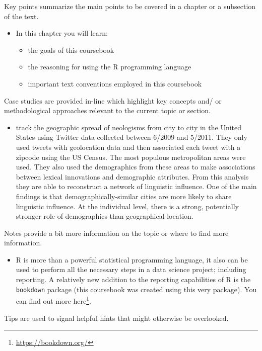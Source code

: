 \documentclass[
]{article}
\DeclareRobustCommand{\href}[2]{#2\footnote{\url{#1}}}
\providecommand{\tightlist}{%
  \setlength{\itemsep}{0pt}\setlength{\parskip}{0pt}}
\newenvironment{rmdblock}[1]
  {\begin{shaded*}
  \begin{itemize}
  \renewcommand{\labelitemi}{
    \raisebox{-.5\height}[0pt][0pt]{
      {\setkeys{Gin}{width=2em,keepaspectratio}\texttt{[image: assets/images/\#1]}}
    }
  }
  \item
  }
  {
  \end{itemize}
  \end{shaded*}
  }
\newenvironment{rmdkey}
  {\begin{rmdblock}{key}}
  {\end{rmdblock}}
\newenvironment{rmdnote}
  {\begin{rmdblock}{note}}
  {\end{rmdblock}}
\newenvironment{rmdstudy}
  {\begin{rmdblock}{paper}}
  {\end{rmdblock}}
\begin{document}
Key points summarize the main points to be covered in a chapter or a subsection of the text.

\begin{rmdkey}
In this chapter you will learn:

\begin{itemize}
\tightlist
\item
  the goals of this coursebook
\item
  the reasoning for using the R programming language
\item
  important text conventions employed in this coursebook
\end{itemize}
\end{rmdkey}

Case studies are provided in-line which highlight key concepts and/ or methodological approaches relevant to the current topic or section.

\begin{rmdstudy}
\citet{Eisenstein2012} track the geographic spread of neologisms from city to city in the United States using Twitter data collected between 6/2009 and 5/2011. They only used tweets with geolocation data and then associated each tweet with a zipcode using the US Census. The most populous metropolitan areas were used. They also used the demographics from these areas to make associations between lexical innovations and demographic attributes. From this analysis they are able to reconstruct a network of linguistic influence. One of the main findings is that demographically-similar cities are more likely to share linguistic influence. At the individual level, there is a strong, potentially stronger role of demographics than geographical location.
\end{rmdstudy}

Notes provide a bit more information on the topic or where to find more information.

\begin{rmdnote}
R is more than a powerful statistical programming language, it also can
be used to perform all the necessary steps in a data science project;
including reporting. A relatively new addition to the reporting
capabilities of R is the \texttt{bookdown} package (this coursebook was
created using this very package). You can find out more
\href{https://bookdown.org/}{here}.
\end{rmdnote}

Tips are used to signal helpful hints that might otherwise be overlooked.
\end{document}
